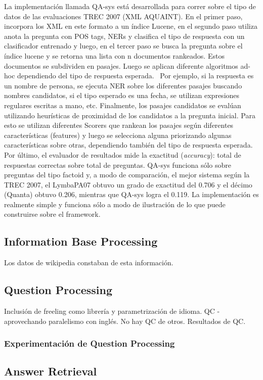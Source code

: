 La implementación llamada QA-sys está desarrollada para correr sobre
el tipo de datos de las evaluaciones TREC 2007 (XML AQUAINT). En el
primer paso, incorpora los XML en este formato a un índice Lucene, en
el segundo paso utiliza anota la pregunta con POS tags, NERs y
clasifica el tipo de respuesta con un clasificador entrenado y luego,
en el tercer paso se busca la pregunta sobre el índice lucene y se
retorna una lista con n documentos rankeados. Estos documentos se
subdividen en pasajes. Luego se aplican diferente algoritmos ad-hoc
dependiendo del tipo de respuesta esperada. \ Por ejemplo, si la
respuesta es un nombre de persona, se ejecuta NER sobre los diferentes
pasajes buscando nombres candidatos, si el tipo esperado es una fecha,
se utilizan expresiones regulares escritas a mano, etc. Finalmente, los
pasajes candidatos se evalúan utilizando heurísticas de proximidad
de los candidatos a la pregunta inicial. Para esto se utilizan
diferentes Scorers que rankean los pasajes según diferentes
características (features) y luego se selecciona alguna priorizando
algunas características sobre otras, dependiendo también del tipo
de respuesta esperada. Por último, el evaluador de resultados mide la
exactitud (\textit{accuracy}): total de respuestas correctas sobre
total de preguntas. QA-sys funciona sólo sobre preguntas del tipo
factoid y, a modo de comparación, el mejor sistema según la TREC
2007, el LymbaPA07 obtuvo un grado de exactitud del 0.706 y el décimo
(Quanta) obtuvo 0.206, mientras que QA-sys logra el 0.119. La
implementación es realmente simple y funciona sólo a modo de
ilustración de lo que puede construirse sobre el framework. 


\subsection{Information Base Processing}
Los datos de wikipedia constaban de esta información.
\subsection{Question Processing}
Inclusión de freeling como librería y parametrización de idioma.
QC -aprovechando paralelismo con inglés. No hay QC de otros.
Resultados de QC.
\subsubsection{Experimentación de Question Processing}
\subsection{Answer Retrieval}
